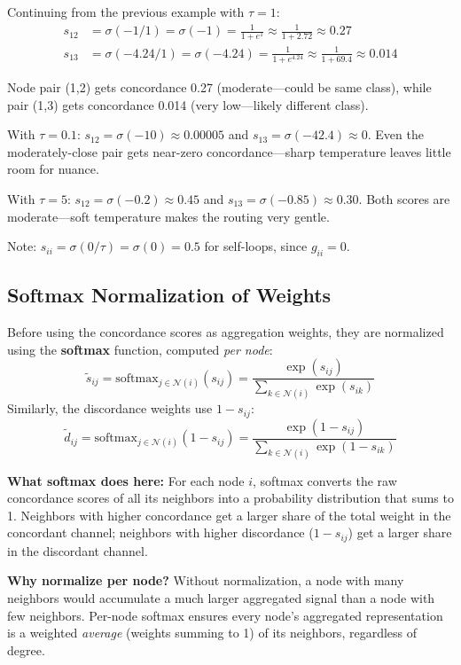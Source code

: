 \documentclass[11pt,a4paper]{article}
\newcommand{\N}{\mathcal{N}}
\theoremstyle{definition}
\theoremstyle{plain}
\begin{document}
\begin{example}
Continuing from the previous example with $\tau = 1$:
\begin{align*}
  s_{12} &= \sigma(-1/1) = \sigma(-1) = \frac{1}{1 + e^{1}} \approx \frac{1}{1 + 2.72} \approx 0.27 \\
  s_{13} &= \sigma(-4.24/1) = \sigma(-4.24) = \frac{1}{1 + e^{4.24}} \approx \frac{1}{1 + 69.4} \approx 0.014
\end{align*}

Node pair (1,2) gets concordance 0.27 (moderate---could be same class),
while pair (1,3) gets concordance 0.014 (very low---likely different class).

With $\tau = 0.1$: $s_{12} = \sigma(-10) \approx 0.00005$ and
$s_{13} = \sigma(-42.4) \approx 0$. Even the moderately-close pair gets near-zero
concordance---sharp temperature leaves little room for nuance.

With $\tau = 5$: $s_{12} = \sigma(-0.2) \approx 0.45$ and
$s_{13} = \sigma(-0.85) \approx 0.30$. Both scores are moderate---soft temperature
makes the routing very gentle.

Note: $s_{ii} = \sigma(0/\tau) = \sigma(0) = 0.5$ for self-loops, since $g_{ii} = 0$.
\end{example}


\subsection{Softmax Normalization of Weights}
\label{sec:softmax}

Before using the concordance scores as aggregation weights, they are normalized
using the \textbf{softmax} function, computed \emph{per node}:
\[
  \tilde{s}_{ij} = \mathrm{softmax}_{j \in \N(i)}(s_{ij})
  = \frac{\exp(s_{ij})}{\sum_{k \in \N(i)} \exp(s_{ik})}
\]
Similarly, the discordance weights use $1 - s_{ij}$:
\[
  \tilde{d}_{ij} = \mathrm{softmax}_{j \in \N(i)}(1 - s_{ij})
  = \frac{\exp(1 - s_{ij})}{\sum_{k \in \N(i)} \exp(1 - s_{ik})}
\]

\textbf{What softmax does here:}
For each node $i$, softmax converts the raw concordance scores of all its
neighbors into a probability distribution that sums to 1.
Neighbors with higher concordance get a larger share of the total weight in
the concordant channel; neighbors with higher discordance ($1 - s_{ij}$) get
a larger share in the discordant channel.

\textbf{Why normalize per node?}
Without normalization, a node with many neighbors would accumulate a much larger
aggregated signal than a node with few neighbors.
Per-node softmax ensures every node's aggregated representation is a weighted
\emph{average} (weights summing to 1) of its neighbors, regardless of degree.
\end{document}
